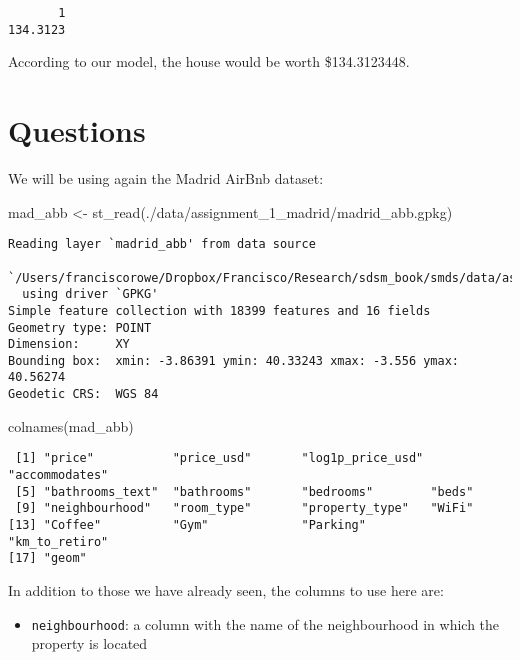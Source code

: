 \documentclass[
  letterpaper,
  krantz2]{style/krantz}
\newenvironment{Shaded}{\begin{snugshade}}{\end{snugshade}}
\newcommand{\FunctionTok}[1]{\textcolor[rgb]{0.28,0.35,0.67}{#1}}
\newcommand{\NormalTok}[1]{\textcolor[rgb]{0.00,0.23,0.31}{#1}}
\newcommand{\OtherTok}[1]{\textcolor[rgb]{0.00,0.23,0.31}{#1}}
\newcommand{\StringTok}[1]{\textcolor[rgb]{0.13,0.47,0.30}{#1}}
\providecommand{\tightlist}{%
  \setlength{\itemsep}{0pt}\setlength{\parskip}{0pt}}\usepackage{longtable,booktabs,array}
\begin{document}
\begin{verbatim}
       1 
134.3123 
\end{verbatim}

According to our model, the house would be worth \$134.3123448.

\hypertarget{questions-2}{%
\section{Questions}\label{questions-2}}

We will be using again the Madrid AirBnb dataset:

\begin{Shaded}
\begin{Highlighting}[]
\NormalTok{mad\_abb }\OtherTok{\textless{}{-}} \FunctionTok{st\_read}\NormalTok{(}\StringTok{\textquotesingle{}./data/assignment\_1\_madrid/madrid\_abb.gpkg\textquotesingle{}}\NormalTok{)}
\end{Highlighting}
\end{Shaded}

\begin{verbatim}
Reading layer `madrid_abb' from data source 
  `/Users/franciscorowe/Dropbox/Francisco/Research/sdsm_book/smds/data/assignment_1_madrid/madrid_abb.gpkg' 
  using driver `GPKG'
Simple feature collection with 18399 features and 16 fields
Geometry type: POINT
Dimension:     XY
Bounding box:  xmin: -3.86391 ymin: 40.33243 xmax: -3.556 ymax: 40.56274
Geodetic CRS:  WGS 84
\end{verbatim}

\begin{Shaded}
\begin{Highlighting}[]
\FunctionTok{colnames}\NormalTok{(mad\_abb)}
\end{Highlighting}
\end{Shaded}

\begin{verbatim}
 [1] "price"           "price_usd"       "log1p_price_usd" "accommodates"   
 [5] "bathrooms_text"  "bathrooms"       "bedrooms"        "beds"           
 [9] "neighbourhood"   "room_type"       "property_type"   "WiFi"           
[13] "Coffee"          "Gym"             "Parking"         "km_to_retiro"   
[17] "geom"           
\end{verbatim}

In addition to those we have already seen, the columns to use here are:

\begin{itemize}
\tightlist
\item
  \texttt{neighbourhood}: a column with the name of the neighbourhood in
  which the property is located
\end{itemize}
\end{document}
